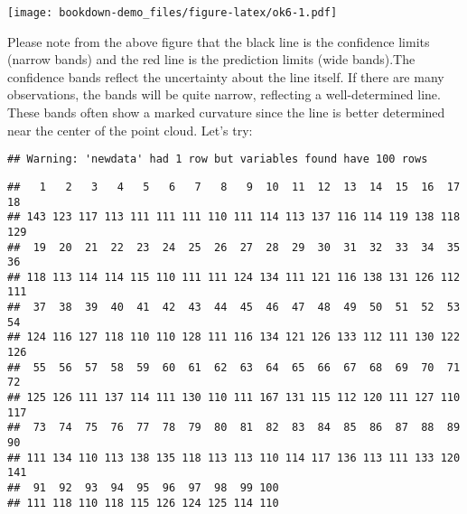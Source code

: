 \documentclass[]{book}
\newenvironment{Shaded}{\begin{snugshade}}{\end{snugshade}}
\newcommand{\KeywordTok}[1]{\textcolor[rgb]{0.13,0.29,0.53}{\textbf{#1}}}
\newcommand{\DataTypeTok}[1]{\textcolor[rgb]{0.13,0.29,0.53}{#1}}
\newcommand{\OperatorTok}[1]{\textcolor[rgb]{0.81,0.36,0.00}{\textbf{#1}}}
\newcommand{\NormalTok}[1]{#1}
\theoremstyle{definition}
\theoremstyle{definition}
\theoremstyle{definition}
\theoremstyle{remark}
\begin{document}
\texttt{[image: bookdown-demo\_files/figure-latex/ok6-1.pdf]}

Please note from the above figure that the black line is the confidence
limits (narrow bands) and the red line is the prediction limits (wide
bands).The confidence bands reflect the uncertainty about the line
itself. If there are many observations, the bands will be quite narrow,
reflecting a well-determined line. These bands often show a marked
curvature since the line is better determined near the center of the
point cloud. Let's try:

\begin{Shaded}
\end{Shaded}

\begin{verbatim}
## Warning: 'newdata' had 1 row but variables found have 100 rows
\end{verbatim}

\begin{verbatim}
##   1   2   3   4   5   6   7   8   9  10  11  12  13  14  15  16  17  18 
## 143 123 117 113 111 111 111 110 111 114 113 137 116 114 119 138 118 129 
##  19  20  21  22  23  24  25  26  27  28  29  30  31  32  33  34  35  36 
## 118 113 114 114 115 110 111 111 124 134 111 121 116 138 131 126 112 111 
##  37  38  39  40  41  42  43  44  45  46  47  48  49  50  51  52  53  54 
## 124 116 127 118 110 110 128 111 116 134 121 126 133 112 111 130 122 126 
##  55  56  57  58  59  60  61  62  63  64  65  66  67  68  69  70  71  72 
## 125 126 111 137 114 111 130 110 111 167 131 115 112 120 111 127 110 117 
##  73  74  75  76  77  78  79  80  81  82  83  84  85  86  87  88  89  90 
## 111 134 110 113 138 135 118 113 113 110 114 117 136 113 111 133 120 141 
##  91  92  93  94  95  96  97  98  99 100 
## 111 118 110 118 115 126 124 125 114 110
\end{verbatim}

\begin{Shaded}
\end{Shaded}
\end{document}
